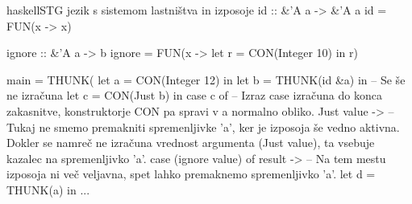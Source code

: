 \begin{code-box}{haskell}{STG jezik s sistemom lastništva in izposoje}
id :: &'A a -> &'A a
id = FUN(x -> x)

ignore :: &'A a -> b
ignore = FUN(x -> let r = CON(Integer 10) in r)

main = THUNK(
    let a = CON(Integer 12) in
    let b = THUNK(id &a) in -- Se še ne izračuna
    let c = CON(Just b) in
    case c of {
        -- Izraz case izračuna do konca zakasnitve, konstruktorje CON pa spravi v a normalno obliko.
        Just value ->
            -- Tukaj ne smemo premakniti spremenljivke 'a', ker je izposoja še vedno aktivna. Dokler se namreč ne izračuna vrednost argumenta (Just value), ta vsebuje kazalec na spremenljivko 'a'.
            case (ignore value) of {
                result ->
                    -- Na tem mestu izposoja ni več veljavna, spet lahko premaknemo spremenljivko 'a'.
                    let d = THUNK(a) in
                        ...
            }
    }
\end{code-box}
